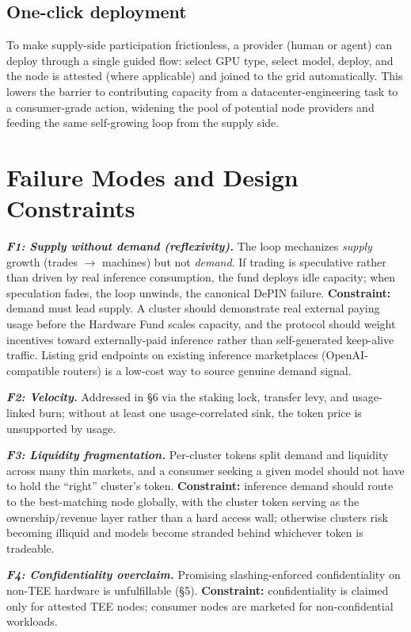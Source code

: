 \documentclass[11pt]{article}
\newcommand{\ph}[1]{\textbf{\textit{#1}}}
\begin{document}
\subsection{One-click deployment}
To make supply-side participation frictionless, a provider (human or agent) can deploy through a single guided flow: select GPU type, select model, deploy, and the node is attested (where applicable) and joined to the grid automatically. This lowers the barrier to contributing capacity from a datacenter-engineering task to a consumer-grade action, widening the pool of potential node providers and feeding the same self-growing loop from the supply side.

\section{Failure Modes and Design Constraints}\label{sec:failure}
\ph{F1: Supply without demand (reflexivity).} The loop mechanizes \textit{supply} growth (trades $\rightarrow$ machines) but not \textit{demand}. If trading is speculative rather than driven by real inference consumption, the fund deploys idle capacity; when speculation fades, the loop unwinds, the canonical DePIN failure. \textbf{Constraint:} demand must lead supply. A cluster should demonstrate real external paying usage before the Hardware Fund scales capacity, and the protocol should weight incentives toward externally-paid inference rather than self-generated keep-alive traffic. Listing grid endpoints on existing inference marketplaces (OpenAI-compatible routers) is a low-cost way to source genuine demand signal.

\ph{F2: Velocity.} Addressed in \S6 via the staking lock, transfer levy, and usage-linked burn; without at least one usage-correlated sink, the token price is unsupported by usage.

\ph{F3: Liquidity fragmentation.} Per-cluster tokens split demand and liquidity across many thin markets, and a consumer seeking a given model should not have to hold the ``right'' cluster's token. \textbf{Constraint:} inference demand should route to the best-matching node globally, with the cluster token serving as the ownership/revenue layer rather than a hard access wall; otherwise clusters risk becoming illiquid and models become stranded behind whichever token is tradeable.

\ph{F4: Confidentiality overclaim.} Promising slashing-enforced confidentiality on non-TEE hardware is unfulfillable (\S5). \textbf{Constraint:} confidentiality is claimed only for attested TEE nodes; consumer nodes are marketed for non-confidential workloads.
\end{document}
